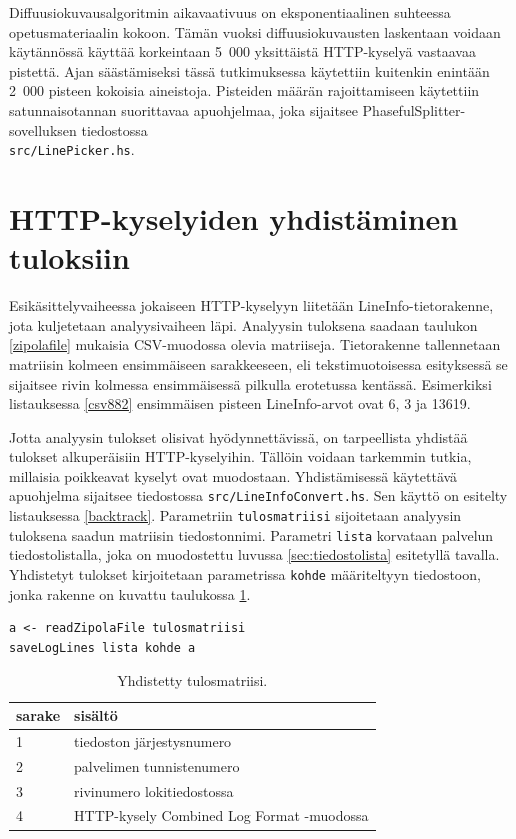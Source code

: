 Diffuusiokuvausalgoritmin aikavaativuus on eksponentiaalinen suhteessa
opetusmateriaalin kokoon. Tämän vuoksi diffuusiokuvausten laskentaan
voidaan käytännössä käyttää korkeintaan 5~000 yksittäistä HTTP-kyselyä
vastaavaa pistettä.  Ajan säästämiseksi tässä tutkimuksessa käytettiin
kuitenkin enintään 2~000 pisteen kokoisia aineistoja. Pisteiden määrän
rajoittamiseen käytettiin satunnaisotannan suorittavaa apuohjelmaa,
joka sijaitsee PhasefulSplitter-sovelluksen tiedostossa \\
\texttt{src/LinePicker.hs}.

\section{HTTP-kyselyiden yhdistäminen tuloksiin}

Esikäsittelyvaiheessa jokaiseen HTTP-kyselyyn liitetään
LineInfo-tietorakenne, jota kuljetetaan analyysivaiheen
läpi. Analyysin tuloksena saadaan taulukon \ref{zipolafile} mukaisia
CSV-muodossa olevia matriiseja. Tietorakenne tallennetaan matriisin
kolmeen ensimmäiseen sarakkeeseen, eli tekstimuotoisessa esityksessä
se sijaitsee rivin kolmessa ensimmäisessä pilkulla erotetussa
kentässä. Esimerkiksi listauksessa \ref{csv882} ensimmäisen pisteen
LineInfo-arvot ovat 6, 3 ja 13619.

Jotta analyysin tulokset olisivat hyödynnettävissä, on tarpeellista
yhdistää tulokset alkuperäisiin HTTP-kyselyihin. Tällöin voidaan
tarkemmin tutkia, millaisia poikkeavat kyselyt ovat
muodostaan. Yhdistämisessä käytettävä apuohjelma sijaitsee tiedostossa
\texttt{src/LineInfoConvert.hs}. Sen käyttö on esitelty
listauksessa \ref{backtrack}.
Parametriin \texttt{tulosmatriisi} sijoitetaan analyysin tuloksena
saadun matriisin tiedostonnimi. Parametri \texttt{lista} korvataan
palvelun tiedostolistalla, joka on muodostettu luvussa
\ref{sec:tiedostolista} esitetyllä tavalla. Yhdistetyt tulokset
kirjoitetaan parametrissa \texttt{kohde} määriteltyyn tiedostoon,
jonka rakenne on kuvattu taulukossa \ref{yhdistetty}.

\begin{lstlisting}[language=MyHaskell,float=h,caption=HTTP-kyselyiden 
  yhdistäminen tuloksiin.,label=backtrack,aboveskip=1cm]
a <- readZipolaFile tulosmatriisi
saveLogLines lista kohde a
\end{lstlisting}

\begin{table}[h]
\centering
\begin{tabular}{l|l}
sarake & sisältö \\
\hline
1 & tiedoston järjestysnumero \\
2 & palvelimen tunnistenumero \\
3 & rivinumero lokitiedostossa \\
4 & HTTP-kysely Combined Log Format -muodossa \\

\end{tabular}
\caption{Yhdistetty tulosmatriisi.}
\label{yhdistetty}
\end{table}



